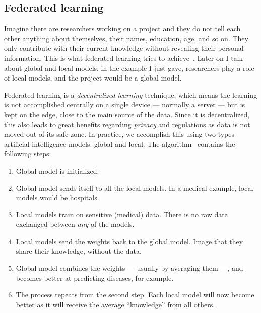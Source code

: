 \subsection{Federated learning} \label{subsec:federative-learning}
Imagine there are researchers working on a project and they do not tell each other anything about themselves, their names, education, age, and so on. They only contribute with their current knowledge without revealing their personal information. This is what federated learning tries to achieve~\cite{FederatedLearningCollaborativea}. Later on I talk about global and local models, in the example I just gave, researchers play a role of local models, and the project would be a global model.

Federated learning is a \emph{decentralized learning} technique, which means the learning is not accomplished centrally on a single device --- normally a server --- but is kept on the edge, close to the main source of the data. Since it is decentralized, this also leads to great benefits regarding \emph{privacy} and regulations as data is not moved out of its safe zone. In practice, we accomplish this using two types artificial intelligence models: global and local. The algorithm~\cite{strykerWhatFederatedLearning2025} contains the following steps:

\begin{enumerate}
 \item Global model is initialized.
 \item Global model sends itself to all the local models. In a medical example, local models would be hospitals.
 \item Local models train on sensitive (medical) data. There is no raw data exchanged between \emph{any} of the models.
 \item Local models send the weights back to the global model. Image that they share their knowledge, without the data.
 \item Global model combines the weights --- usually by averaging them ---, and becomes better at predicting diseases, for example.
 \item The process repeats from the second step. Each local model will now become better as it will receive the average ``knowledge'' from all others.
\end{enumerate}

